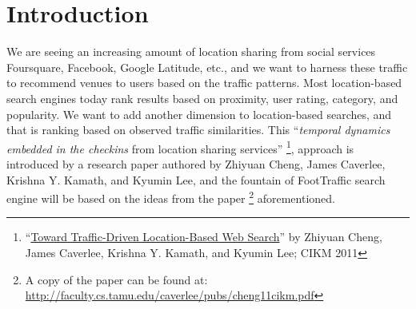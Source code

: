 \documentclass{article}
\begin{document}
%


%

%
\section{Introduction}
We are seeing an increasing amount of location sharing from social services Foursquare, Facebook, Google Latitude, etc.,
and we want to harness these traffic to recommend venues to users based on the traffic patterns. Most location-based
search engines today rank results based on proximity, user rating, category, and popularity. We want to add another 
dimension to location-based searches, and that is ranking based on observed traffic similarities.
This ``\textit{temporal dynamics embedded in the checkins} from location sharing services''
\footnote{``\href{http://faculty.cs.tamu.edu/caverlee/pubs/cheng11cikm.pdf}{Toward Traffic-Driven Location-Based Web Search}''
  by Zhiyuan Cheng, James Caverlee, Krishna Y. Kamath, and Kyumin Lee; CIKM 2011},
approach is introduced by a research paper authored by Zhiyuan Cheng, James Caverlee, Krishna Y. Kamath,
and Kyumin Lee, and the fountain of FootTraffic search engine will be based on the ideas from the paper
\footnote{A copy of the paper can be found at: \url{http://faculty.cs.tamu.edu/caverlee/pubs/cheng11cikm.pdf}}
aforementioned.

\end{document}

